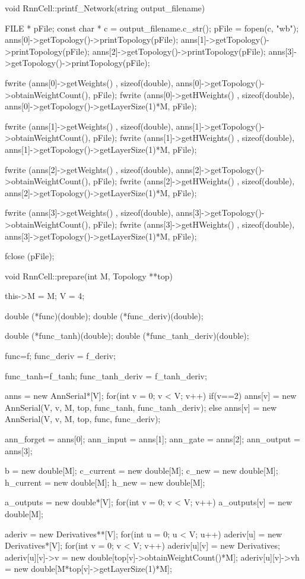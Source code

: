 void RnnCell::printf\_Network(string output\_filename){

    FILE * pFile;
    const char * c = output\_filename.c\_str();
    pFile = fopen(c, "wb");
    anns[0]->getTopology()->printTopology(pFile);
    anns[1]->getTopology()->printTopology(pFile);
    anns[2]->getTopology()->printTopology(pFile);
    anns[3]->getTopology()->printTopology(pFile);

    fwrite (anns[0]->getWeights() , sizeof(double), anns[0]->getTopology()->obtainWeightCount(), pFile);
    fwrite (anns[0]->getHWeights() , sizeof(double), anns[0]->getTopology()->getLayerSize(1)*M, pFile);

    fwrite (anns[1]->getWeights() , sizeof(double), anns[1]->getTopology()->obtainWeightCount(), pFile);
    fwrite (anns[1]->getHWeights() , sizeof(double), anns[1]->getTopology()->getLayerSize(1)*M, pFile);

    fwrite (anns[2]->getWeights() , sizeof(double), anns[2]->getTopology()->obtainWeightCount(), pFile);
    fwrite (anns[2]->getHWeights() , sizeof(double), anns[2]->getTopology()->getLayerSize(1)*M, pFile);

    fwrite (anns[3]->getWeights() , sizeof(double), anns[3]->getTopology()->obtainWeightCount(), pFile);
    fwrite (anns[3]->getHWeights() , sizeof(double), anns[3]->getTopology()->getLayerSize(1)*M, pFile);

    fclose (pFile);
}

void RnnCell::prepare(int M, Topology **top){
  this->M = M;
  V = 4;

  double (*func)(double);
  double (*func\_deriv)(double);

  double (*func\_tanh)(double);
  double (*func\_tanh\_deriv)(double);

  func=f;
  func\_deriv = f\_deriv;

  func\_tanh=f\_tanh;
  func\_tanh\_deriv = f\_tanh\_deriv;


  anns = new AnnSerial*[V];
  for(int v = 0; v < V; v++){
    if(v==2){
      anns[v] = new AnnSerial(V, v, M, top, func\_tanh, func\_tanh\_deriv);
    } else {
      anns[v] = new AnnSerial(V, v, M, top, func, func\_deriv);
    }
  }

  ann\_forget = anns[0];
  ann\_input = anns[1];
  ann\_gate = anns[2];
  ann\_output = anns[3];




  b = new double[M];
  c\_current = new double[M];
  c\_new = new double[M];
  h\_current = new double[M];
  h\_new = new double[M];

  a\_outputs = new double*[V];
  for(int v = 0; v < V; v++){
    a\_outputs[v] = new double[M];
  }

  aderiv = new Derivatives**[V];
  for(int u = 0; u < V; u++){
    aderiv[u] = new Derivatives*[V];
    for(int v = 0; v < V; v++){
      aderiv[u][v] = new Derivatives;
      aderiv[u][v]->v = new double[top[v]->obtainWeightCount()*M];
      aderiv[u][v]->vh = new double[M*top[v]->getLayerSize(1)*M];
    }
  }
}



